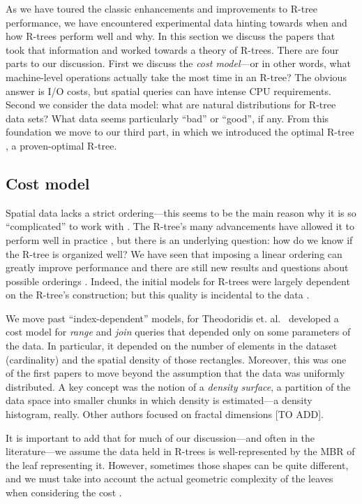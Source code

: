 As we have toured the classic enhancements and improvements to R-tree performance, we have encountered experimental data hinting towards when and how R-trees perform well and why.
In this section we discuss the papers that took that information and worked towards a theory of R-trees.
There are four parts to our discussion.
First we discuss the \emph{cost model}---or in other words, what machine-level operations actually take the most time in an R-tree?
The obvious answer is I/O costs, but spatial queries can have intense CPU requirements.
Second we consider the data model: what are natural distributions for R-tree data sets?
What data seems particularly ``bad'' or ``good'', if any.
From this foundation we move to our third part, in which we introduced the optimal R-tree \cite{argeberghaverkortyi04}, a proven-optimal R-tree.

\subsection{Cost model}
Spatial data lacks a strict ordering---this seems to be the main reason why it is so ``complicated'' to work with \cite{gaedegunther98}.
The R-tree's many advancements have allowed it to perform well in practice \cite{thebook}, but there is an underlying question: how do we know if the R-tree is organized well?
We have seen that imposing a linear ordering can greatly improve performance \cite{kamelfaloutsos94} and there are still new results and questions about possible orderings \cite{haverkortwalderveen11}.
Indeed, the initial models for R-trees were largely dependent on the R-tree's construction; but this quality is incidental to the data \cite{see:list:in:theodoridisstefanakissellis}.

We move past ``index-dependent'' models, for Theodoridis et. al.\ \cite{theodoridissellis96,theodoridisstefanakissellis00} developed a cost model for \emph{range} and \emph{join} queries that depended only on some parameters of the data.
In particular, it depended on the number of elements in the dataset (cardinality) and the spatial density of those rectangles.
Moreover, this was one of the first papers to move beyond the assumption that the data was uniformly distributed.
A key concept was the notion of a \emph{density surface}, a partition of the data space into smaller chunks in which density is estimated---a density histogram, really.
Other authors focused on fractal dimensions [TO ADD].

It is important to add that for much of our discussion---and often in the literature---we assume the data held in R-trees is well-represented by the MBR of the leaf representing it.
However, sometimes those shapes can be quite different, and we must take into account the actual geometric complexity of the leaves when considering the cost \cite{aboulnaganaughton00}.

